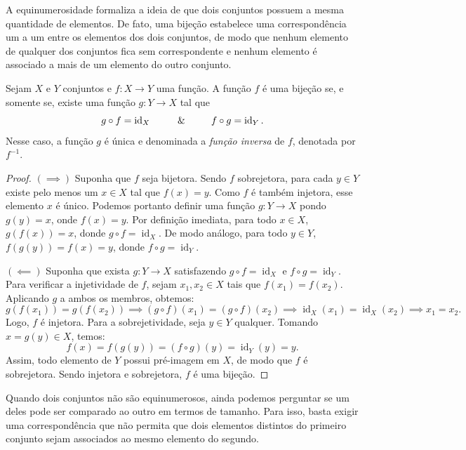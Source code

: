 A equinumerosidade formaliza a ideia de que dois conjuntos possuem a mesma quantidade de elementos. De fato, uma bijeção estabelece uma correspondência um a um entre os elementos dos dois conjuntos, de modo que nenhum elemento de qualquer dos conjuntos fica sem correspondente e nenhum elemento é associado a mais de um elemento do outro conjunto.

\begin{proposicao}
    \label{prop:caracterizacao_bijecao_inversa}
    Sejam \(X\) e \(Y\) conjuntos e \(f: X \to Y\) uma função. A função \(f\) é uma bijeção se, e somente se, existe uma função \(g: Y \to X\) tal que
    \[
        g \circ f = \operatorname{id}_X \qquad \ \ \& \ \  \qquad f \circ g = \operatorname{id}_Y.
    \]
    Nesse caso, a função \(g\) é única e denominada a \emph{função inversa} de \(f\), denotada por \(f^{-1}\).
\end{proposicao}

\begin{proof}
    \((\implies)\) Suponha que \(f\) seja bijetora. Sendo \(f\) sobrejetora, para cada \(y \in Y\) existe pelo menos um \(x \in X\) tal que \(f(x) = y\). Como \(f\) é também injetora, esse elemento \(x\) é único. Podemos portanto definir uma função \(g: Y \to X\) pondo \(g(y) = x\), onde \(f(x) = y\). Por definição imediata, para todo \(x \in X\), \(g(f(x)) = x\), donde \(g \circ f = \operatorname{id}_X\). De modo análogo, para todo \(y \in Y\), \(f(g(y)) = f(x) = y\), donde \(f \circ g = \operatorname{id}_Y\).

    \((\impliedby)\) Suponha que exista \(g: Y \to X\) satisfazendo \(g \circ f = \operatorname{id}_X\) e \(f \circ g = \operatorname{id}_Y\).
    Para verificar a injetividade de \(f\), sejam \(x_1, x_2 \in X\) tais que \(f(x_1) = f(x_2)\). Aplicando \(g\) a ambos os membros, obtemos:
    \[
        g(f(x_1)) = g(f(x_2)) \implies (g \circ f)(x_1) = (g \circ f)(x_2) \implies \operatorname{id}_X(x_1) = \operatorname{id}_X(x_2) \implies x_1 = x_2.
    \]
    Logo, \(f\) é injetora. Para a sobrejetividade, seja \(y \in Y\) qualquer. Tomando \(x = g(y) \in X\), temos:
    \[
        f(x) = f(g(y)) = (f \circ g)(y) = \operatorname{id}_Y(y) = y.
    \]
    Assim, todo elemento de \(Y\) possui pré-imagem em \(X\), de modo que \(f\) é sobrejetora. Sendo injetora e sobrejetora, \(f\) é uma bijeção.
\end{proof}

Quando dois conjuntos não são equinumerosos, ainda podemos perguntar se um deles pode ser comparado ao outro em termos de tamanho. Para isso, basta exigir uma correspondência que não permita que dois elementos distintos do primeiro conjunto sejam associados ao mesmo elemento do segundo.

